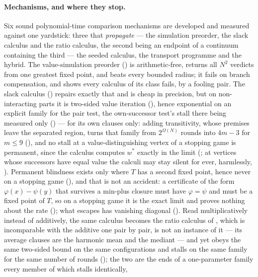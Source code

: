 \documentclass[11pt]{article}
\theoremstyle{plain}
\theoremstyle{definition}
\begin{document}
\paragraph{Mechanisms, and where they stop.} Six sound polynomial-time
comparison mechanisms are developed and measured against one yardstick:
three that \emph{propagate} --- the simulation preorder, the slack
calculus and the ratio calculus, the second being an endpoint of a
continuum containing the third --- the seeded calculus, the transport
programme and the hybrid.
The value-simulation preorder () is arithmetic-free,
returns all $N^{2}$ verdicts from one greatest fixed point, and beats
every bounded radius; it fails on branch compensation, and
 shows every calculus of its class fails, by a
fooling pair. The slack calculus () repairs exactly that
and is cheap in precision, but on non-interacting parts it is two-sided
value iteration (), hence exponential on an
explicit family for the pair test, the own-successor test's stall there
being measured only () --- for its own clauses
only: adding transitivity, whose
premises leave the separated region, turns that family from
$2^{\Omega(N)}$ rounds into $4m-3$ for $m\le9$ (), and no
stall at a value-distinguishing vertex of a stopping game is permanent,
since the calculus computes $w^\ast$ exactly in the limit
(; at vertices whose successors have equal value
the calculi may stay silent for ever, harmlessly, ). Permanent
blindness exists only where $T$ has a second fixed point, hence never on
a stopping game (), and that
is not an accident: a certificate of the form $\varphi(x)-\psi(y)$ that
survives a min-plus closure must have $\varphi=\psi$ and must be a
fixed point of $T$, so on a stopping game it is the exact limit and
proves nothing about the rate (); what escapes has
vanishing diagonal (). Read multiplicatively
instead of additively, the same calculus becomes the ratio calculus of
, which is incomparable with the additive one pair by
pair, is not an instance of it --- its average clauses are the harmonic
mean and the mediant --- and yet obeys the same two-sided bound on the
same configurations and stalls on the same family for the same number of
rounds (); the two are the ends
of a one-parameter family every member of which stalls identically,
\end{document}
